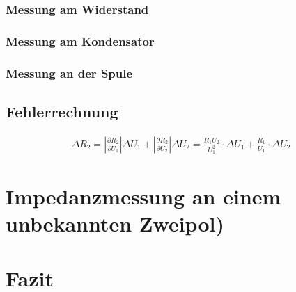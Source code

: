 \documentclass{scrartcl}
\begin{document}
\subsubsection{Messung am Widerstand}
\subsubsection{Messung am Kondensator}
\subsubsection{Messung an der Spule}
\subsection{Fehlerrechnung}
\begin{align*}
\Delta R_{2} = \left| \frac{\partial R_{2}}{\partial U_{1}} \right| \Delta U_{1} + \left| \frac{\partial R_{2}}{\partial U_{2}} \right| \Delta U_{2} = \frac{R_{1}U_{2}}{U_{1}^2} \cdot \Delta U_{1} + \frac{R_{1}}{U_{1}} \cdot \Delta U_{2}
\end{align*}
\section{Impedanzmessung an einem unbekannten Zweipol)}

\section{Fazit}
\end{document}
